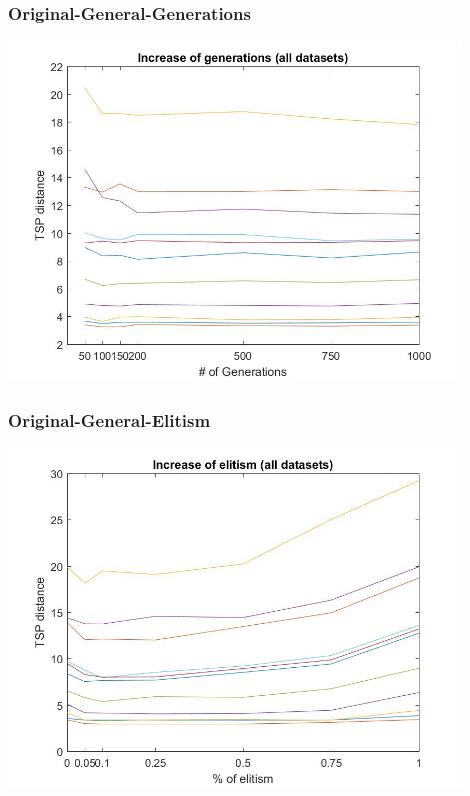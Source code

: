 \subsubsection{Original-General-Generations}
\begin{center}
\includegraphics[width=12cm]{img/xalt_edges/numberGens.jpg}
\end{center}
\subsubsection{Original-General-Elitism}
\begin{center}
\includegraphics[width=12cm]{img/xalt_edges/elitism.jpg}
\end{center}
